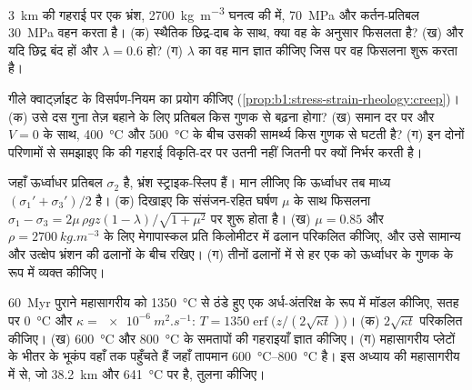 \begin{exercise}[$\star\star$]\label{exo:b1:stress-strain-rheology:8}
\qty{3}{km} की गहराई पर एक भ्रंश, \qty{2700}{kg.m^{-3}} घनत्व की  में,  \qty{70}{MPa} और कर्तन-प्रतिबल \qty{30}{MPa} वहन करता है। (क) स्थैतिक छिद्र-दाब के साथ, क्या वह  के अनुसार फिसलता है? (ख) और यदि छिद्र बंद हों और $\lambda = 0.6$ हो? (ग) $\lambda$ का वह मान ज्ञात कीजिए जिस पर वह फिसलना शुरू करता है।
\end{exercise}

\begin{exercise}[$\star\star$]\label{exo:b1:stress-strain-rheology:9}
गीले क्वार्ट्ज़ाइट के विसर्पण-नियम का प्रयोग कीजिए (\cref{prop:b1:stress-strain-rheology:creep})। (क) उसे दस गुना तेज़ बहाने के लिए प्रतिबल किस गुणक से बढ़ना होगा? (ख) समान दर पर और $V = 0$ के साथ, \qty{400}{\degreeCelsius} और \qty{500}{\degreeCelsius} के बीच उसकी सामर्थ्य किस गुणक से घटती है? (ग) इन दोनों परिणामों से समझाइए कि  की गहराई विकृति-दर पर उतनी नहीं जितनी  पर क्यों निर्भर करती है।
\end{exercise}

\begin{exercise}[$\star\star\star$]\label{exo:b1:stress-strain-rheology:10}
जहाँ ऊर्ध्वाधर प्रतिबल $\sigma_2$ है, भ्रंश स्ट्राइक-स्लिप हैं। मान लीजिए कि ऊर्ध्वाधर  तब माध्य $(\sigma_1' + \sigma_3')/2$ है। (क) दिखाइए कि संसंजन-रहित घर्षण $\mu$ के साथ फिसलना $\sigma_1 - \sigma_3 = 2\mu\,\rho g z(1-\lambda)/\sqrt{1+\mu^2}$ पर शुरू होता है। (ख) $\mu = 0.85$ और $\rho = \qty{2700}{kg.m^{-3}}$ के लिए मेगापास्कल प्रति किलोमीटर में ढलान परिकलित कीजिए, और उसे सामान्य और उत्क्षेप भ्रंशन की ढलानों के बीच रखिए। (ग) तीनों ढलानों में से हर एक को ऊर्ध्वाधर  के गुणक के रूप में व्यक्त कीजिए।
\end{exercise}

\begin{exercise}[$\star\star\star$]\label{exo:b1:stress-strain-rheology:11}
\qty{60}{Myr} पुराने महासागरीय  को \qty{1350}{\degreeCelsius} से ठंडे हुए एक अर्ध-अंतरिक्ष के रूप में मॉडल कीजिए, सतह पर \qty{0}{\degreeCelsius} और $\kappa = \qty{e-6}{m^2.s^{-1}}$: $T = \num{1350}\operatorname{erf}\bigl(z/(2\sqrt{\kappa t})\bigr)$। (क) $2\sqrt{\kappa t}$ परिकलित कीजिए। (ख) \qty{600}{\degreeCelsius} और \qty{800}{\degreeCelsius} के समतापों की गहराइयाँ ज्ञात कीजिए। (ग) महासागरीय प्लेटों के भीतर के भूकंप वहाँ तक पहुँचते हैं जहाँ तापमान \qtyrange{600}{800}{\degreeCelsius} है। इस अध्याय की महासागरीय  में  से, जो \qty{38.2}{km} और \qty{641}{\degreeCelsius} पर है, तुलना कीजिए।
\end{exercise}

